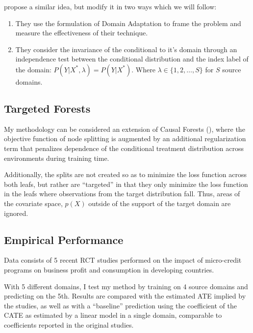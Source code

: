 \documentclass[a4paper,12pt]{article}
\begin{document}
\cite{Rojas-carulla2018} propose a similar idea, but modify it in two ways which we will follow: 

\begin{enumerate}
\item They use the formulation of Domain Adaptation to frame the problem and measure the effectiveness of their technique. 
\item They consider the invariance of the conditional to it's domain through an independence test between the conditional distribution and the index label of the domain: $P(Y | X^*, \lambda) = P(Y | X^*)$. Where $\lambda \in \{1,2,\ldots,S \}$ for $S$ source domains. 

\end{enumerate}

\subsection*{Targeted Forests}

My methodology can be considered an extension of Causal Forests (\cite{}), where the objective function of node splitting is augmented by an additional regularization term that penalizes dependence of the conditional treatment distribution across environments during training time. 

Additionally, the splits are not created so as to minimize the loss function across both leafs, but rather are ``targeted'' in that they only minimize the loss function in the leafs where observations from the target distribution fall. Thus, areas of the covariate space, $p(X)$ outside of the support of the target domain are ignored. 

\subsection*{Empirical Performance}

Data consists of 5 recent RCT studies performed on the impact of micro-credit programs on business profit and consumption in developing countries. 

With 5 different domains, I test my method by training on 4 source domains and predicting on the 5th. Results are compared with the estimated ATE implied by the studies, as well as with a ``baseline'' prediction using the coefficient of the CATE as estimated by a linear model in a single domain, comparable to coefficients reported in the original studies. 


\end{document}
